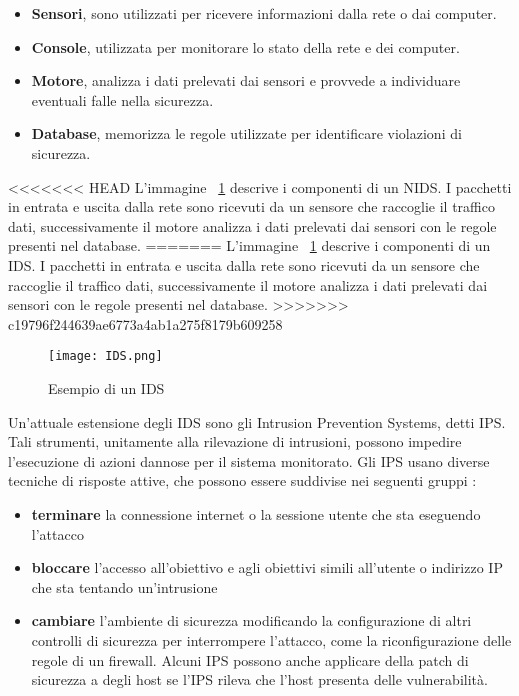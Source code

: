 \documentclass[../main.tex]{subfiles}
\begin{document}
\begin{itemize}
				\item \textbf{Sensori}, sono utilizzati per ricevere informazioni dalla rete o dai computer.

				\item \textbf{Console}, utilizzata per monitorare lo stato della rete e dei computer.

				\item \textbf{Motore}, analizza i dati prelevati dai sensori e provvede a individuare eventuali falle nella sicurezza.

				\item \textbf{Database}, memorizza le regole utilizzate per identificare violazioni di sicurezza.
\end{itemize}

<<<<<<< HEAD
L'immagine ~\ref{fig:esempioIds} descrive i componenti di un NIDS. I pacchetti in entrata e uscita dalla rete sono ricevuti da un sensore che raccoglie il traffico dati, successivamente il motore analizza i dati prelevati dai sensori con le regole presenti nel database.
=======
L'immagine ~\ref{fig:esempioIds} descrive i componenti di un IDS. I pacchetti in entrata e uscita dalla rete sono ricevuti da un sensore che raccoglie il traffico dati, successivamente il motore analizza i dati prelevati dai sensori con le regole presenti nel database.
>>>>>>> c19796f244639ae6773a4ab1a275f8179b609258

\begin{figure}[H]
				\centering
				\texttt{[image: IDS.png]}
				\caption{Esempio di un IDS}
				\label{fig:esempioIds}
\end{figure}

Un'attuale estensione degli IDS sono gli Intrusion Prevention Systems, detti IPS. Tali strumenti, unitamente alla rilevazione di intrusioni, possono impedire l'esecuzione di azioni dannose per il sistema monitorato. Gli IPS usano diverse tecniche di risposte attive, che possono essere suddivise nei seguenti gruppi \cite{IPS}:

\begin{itemize}
				\item \textbf{terminare} la connessione internet o la sessione utente che sta eseguendo l'attacco
				\item \textbf{bloccare} l'accesso all'obiettivo e agli obiettivi simili all'utente o indirizzo IP che sta tentando un'intrusione
				\item \textbf{cambiare} l'ambiente di sicurezza modificando la configurazione di altri controlli di sicurezza per interrompere l'attacco, come la riconfigurazione delle regole di un firewall. Alcuni IPS possono anche applicare della patch di sicurezza a degli host se l'IPS rileva che l'host presenta delle vulnerabilità.
\end{itemize}
\end{document}
